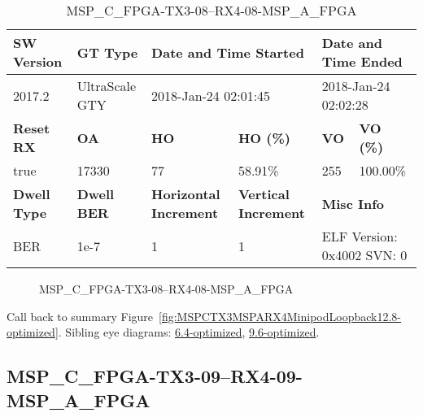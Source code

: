 \begin{table}[h]
\centering
\caption{MSP\_C\_FPGA-TX3-08--RX4-08-MSP\_A\_FPGA}
\label{tab:MSPCFPGATX308RX408MSPAFPGA12.8-optimized}
\begin{tabular}{@{}|l|l|l|l|l|l|@{}}
\toprule
\textbf{SW Version}                & \textbf{GT Type}   & \multicolumn{2}{l|}{\textbf{Date and Time Started}}            & \multicolumn{2}{l|}{\textbf{Date and Time Ended}}        \\ \midrule
2017.2                       & UltraScale GTY          & \multicolumn{2}{l|}{2018-Jan-24 02:01:45}                   & \multicolumn{2}{l|}{2018-Jan-24 02:02:28}               \\ \midrule
\textbf{Reset RX}                  & \textbf{OA} & \textbf{HO}   & \textbf{HO (\%)} & \textbf{VO} & \textbf{VO (\%)} \\ \midrule
true & 17330        & 77          & 58.91\%        & 255        & 100.00\%       \\ \midrule
\textbf{Dwell Type}                & \textbf{Dwell BER} & \textbf{Horizontal Increment} & \textbf{Vertical Increment}    & \multicolumn{2}{l|}{\textbf{Misc Info}}                  \\ \midrule
BER                            & 1e-7        & 1        & 1           & \multicolumn{2}{l|}{ELF Version: 0x4002 SVN: 0}                         \\ \bottomrule
\end{tabular}
\end{table}

\begin{figure}[h]
\caption{MSP\_C\_FPGA-TX3-08--RX4-08-MSP\_A\_FPGA} \label{fig:MSPCFPGATX308RX408MSPAFPGA12.8-optimized}
\end{figure}

Call back to summary Figure~\ref{fig:MSPCTX3MSPARX4MinipodLoopback12.8-optimized}.
Sibling eye diagrams: \hyperref[sec:MSPCFPGATX308RX408MSPAFPGA6.4-optimized]{6.4-optimized}, \hyperref[sec:MSPCFPGATX308RX408MSPAFPGA9.6-optimized]{9.6-optimized}.

\clearpage
\newpage


\subsection{MSP\_C\_FPGA-TX3-09--RX4-09-MSP\_A\_FPGA}\label{sec:MSPCFPGATX309RX409MSPAFPGA12.8-optimized}

